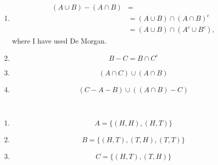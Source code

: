 \begin{problem}{3} $ $
	\begin{enumerate}
		
		\item 
			\begin{align} 
				(A \cup B) - (A \cap B) & =  \nonumber\\
				& =(A \cup B) \cap (A \cap B)^c  \nonumber\\
				&= (A \cup B) \cap (A^c \cup B^c),\nonumber
			\end{align}
			where I have used De Morgan.
			
		\item
			\begin{equation} 
				B-C = B \cap C^c \nonumber
			\end{equation} 

		\item
			\begin{equation} 
				(A\cap C)\cup(A \cap B) \nonumber
			\end{equation} 
	
		\item
			\begin{equation} 
				(C-A-B)\cup ((A\cap B)-C) \nonumber
			\end{equation} 


	\end{enumerate}
\end{problem}



\begin{problem}{4} $ $
	\begin{enumerate}
		
		\item 
			\begin{equation} 
				A = \{(H,H), (H,T) \} \nonumber
			\end{equation}
			
		\item 
			\begin{equation} 
				B = \{ (H, T), (T,H), (T,T) \} \nonumber
			\end{equation}
			
		\item 
			\begin{equation} 
				C = \{ (H, T), (T,H) \} \nonumber
			\end{equation}


	\end{enumerate}
\end{problem}


